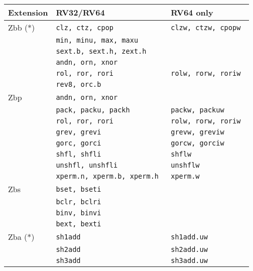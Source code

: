 \begin{table}[!h]
\begin{center}
\begin{tabular}{lll}
Extension & RV32/RV64 & RV64 only \\
\hline
Zbb (*)
 & {\tt clz, ctz, cpop            } & {\tt clzw, ctzw, cpopw         } \\
 & {\tt min, minu, max, maxu      } & {\tt                           } \\
 & {\tt sext.b, sext.h, zext.h    } & {\tt                           } \\
 & {\tt andn, orn, xnor           } & {\tt                           } \\
 & {\tt rol, ror, rori            } & {\tt rolw, rorw, roriw         } \\
 & {\tt rev8, orc.b               } & {\tt                           } \\
\hline
Zbp
 & {\tt andn, orn, xnor           } & {\tt                           } \\
 & {\tt pack, packu, packh        } & {\tt packw, packuw             } \\
 & {\tt rol, ror, rori            } & {\tt rolw, rorw, roriw         } \\
 & {\tt grev, grevi               } & {\tt grevw, greviw             } \\
 & {\tt gorc, gorci               } & {\tt gorcw, gorciw             } \\
 & {\tt shfl, shfli               } & {\tt shflw                     } \\
 & {\tt unshfl, unshfli           } & {\tt unshflw                   } \\
 & {\tt xperm.n, xperm.b, xperm.h } & {\tt xperm.w                   } \\
\hline
Zbs
 & {\tt bset, bseti               } & {\tt                           } \\
 & {\tt bclr, bclri               } & {\tt                           } \\
 & {\tt binv, binvi               } & {\tt                           } \\
 & {\tt bext, bexti               } & {\tt                           } \\
\hline
Zba (*)
 & {\tt sh1add                    } & {\tt sh1add.uw                 } \\
 & {\tt sh2add                    } & {\tt sh2add.uw                 } \\
 & {\tt sh3add                    } & {\tt sh3add.uw                 } \\

\end{tabular}
\end{center}
\end{table}
